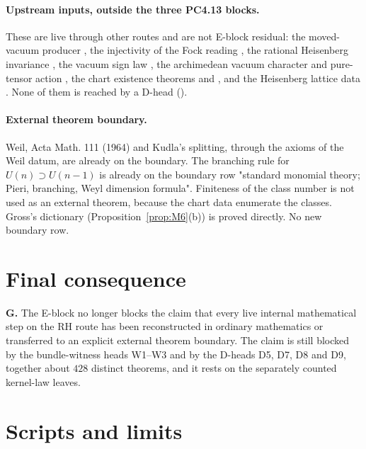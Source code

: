 \documentclass[11pt]{article}
\theoremstyle{remark}
\begin{document}
\paragraph{Upstream inputs, outside the three PC4.13 blocks.} These are live through other routes and are not E-block residual: the moved-vacuum producer , the injectivity of the Fock reading , the rational Heisenberg invariance , the vacuum sign law , the archimedean vacuum character  and pure-tensor action , the chart existence theorems  and , and the Heisenberg lattice data . None of them is reached by a D-head ().

\paragraph{External theorem boundary.} Weil, Acta Math. 111 (1964) and Kudla's splitting, through the axioms of the Weil datum, are already on the boundary. The branching rule for $U(n)\supset U(n-1)$ is already on the boundary row "standard monomial theory; Pieri, branching, Weyl dimension formula". Finiteness of the class number is not used as an external theorem, because the chart data enumerate the classes. Gross's dictionary (Proposition~\ref{prop:M6}(b)) is proved directly. No new boundary row.

\section{Final consequence}\label{sec:final}

\textbf{G.} The E-block no longer blocks the claim that every live internal mathematical step on the RH route has been reconstructed in ordinary mathematics or transferred to an explicit external theorem boundary. The claim is still blocked by the bundle-witness heads W1--W3 and by the D-heads D5, D7, D8 and D9, together about $428$ distinct theorems, and it rests on the separately counted kernel-law leaves.

\section{Scripts and limits}\label{sec:limits}
\end{document}
